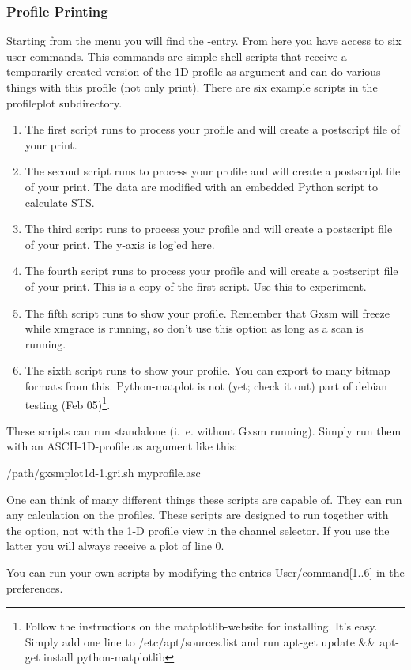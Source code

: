 \subsubsection{Profile Printing}
Starting from the  menu you will find the
-entry. From here you have access to six user commands.
This commands are simple shell scripts that receive a temporarily created
version of the 1D profile as argument and can do various things with this 
profile (not only print). There are six example scripts in the profileplot
subdirectory. 
\begin{enumerate}
\item The first script runs  to process your profile and will
create a postscript file of your print.
\item The second script runs  to process your profile and will
create a postscript file of your print. The data are modified with an
embedded Python script to calculate STS.
\item The third script runs  to process your profile and will
create a postscript file of your print. The y-axis is log'ed here.
\item The fourth script runs  to process your profile and will
create a postscript file of your print. This is a copy of the first script.
Use this to experiment.
\item The fifth script runs  to show your profile.
Remember that Gxsm will freeze while xmgrace is running, so don't use this
option as long as a scan is running.
\item The sixth script runs  to show your profile.
You can export to many bitmap formats from this. Python-matplot is not (yet;
check it out) part of debian testing (Feb 05)\footnote{Follow the instructions
on the matplotlib-website for installing. It's easy. Simply add one line to /etc/apt/sources.list
and run apt-get update \&\& apt-get install python-matplotlib}.
\end{enumerate}

These scripts can run standalone (i.\ e. without Gxsm running). Simply run them with an
ASCII-1D-profile as argument like this:

/path/gxsmplot1d-1.gri.sh myprofile.asc

One can think of many different things these scripts are capable of. They
can run any calculation on the profiles. These scripts are designed to run
together with the  option, not with the 1-D profile view
in the channel selector. If you use the latter you will always receive a
plot of line 0.


You can run your own scripts by modifying the entries
User/command[1..6] in the preferences.



